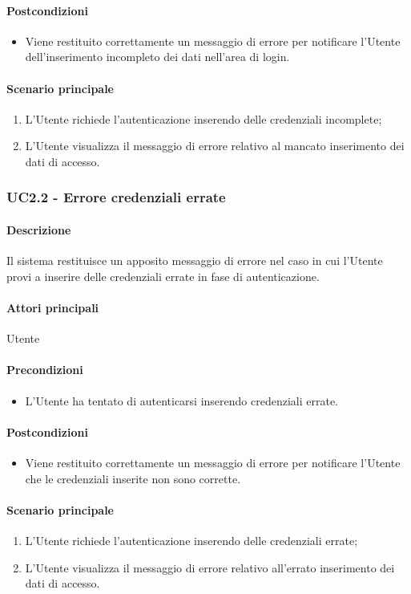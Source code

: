 \paragraph*{Postcondizioni}
\begin{itemize}
  \item Viene restituito correttamente un messaggio di errore per notificare l'Utente dell'inserimento incompleto dei dati nell'area di login.
\end{itemize}

\paragraph*{Scenario principale}
\begin{enumerate}
  \item L'Utente richiede l'autenticazione inserendo delle credenziali incomplete;
  \item L'Utente visualizza il messaggio di errore relativo al mancato inserimento dei dati di accesso.   
\end{enumerate}


\subsubsection{UC2.2 - Errore credenziali errate}\label{UC2point2}
\paragraph*{Descrizione}
Il sistema restituisce un apposito messaggio di errore nel caso in cui l'Utente provi a inserire delle credenziali errate in fase di autenticazione.

\paragraph*{Attori principali}
Utente

\paragraph*{Precondizioni}
\begin{itemize}
  \item L'Utente ha tentato di autenticarsi inserendo credenziali errate.  
\end{itemize}

\paragraph*{Postcondizioni}
\begin{itemize}
  \item Viene restituito correttamente un messaggio di errore per notificare l'Utente che le credenziali inserite non sono corrette.
\end{itemize}

\paragraph*{Scenario principale}
\begin{enumerate}
  \item L'Utente richiede l'autenticazione inserendo delle credenziali errate;   
  \item L'Utente visualizza il messaggio di errore relativo all'errato inserimento dei dati di accesso.   
\end{enumerate}
